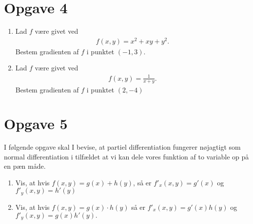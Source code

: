 \section*{Opgave 4}
\begin{enumerate}[label=\roman*)]
	\item Lad $f$ være givet ved
		\begin{align*}
			f(x,y) = x^2+xy+y^2.
		\end{align*}
		Bestem gradienten af $f$ i punktet $(-1,3)$.
	\item Lad $f$ være givet ved
	\begin{align*}
		f(x,y) = \frac{1}{x+y}.
	\end{align*}
	Bestem gradienten af $f$ i punktet $(2,-4)$
\end{enumerate}

\section*{Opgave 5}
I følgende opgave skal I bevise, at partiel differentiation fungerer nøjagtigt som normal differentiation i tilfældet at vi kan dele vores funktion af to variable op på en pæn måde.
\begin{enumerate}[label=\roman*)]
	\item Vis, at hvis $f(x,y) = g(x)+h(y)$, så er $f'_x(x,y) = g'(x)$ og $f'_y(x,y) = h'(y)$
	\item Vis, at hvis $f(x,y) = g(x)\cdot h(y)$ så er $f'_x(x,y) = g'(x)h(y)$ og $f'_y(x,y) = g(x)h'(y).$
\end{enumerate}